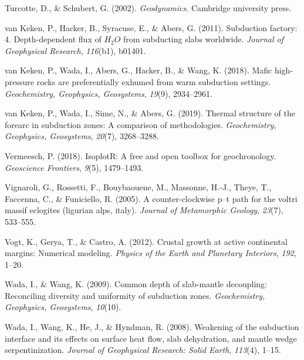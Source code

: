 \begin{CSLReferences}{1}{1}
\leavevmode{}%
Turcotte, D., \& Schubert, G. (2002). \emph{Geodynamics}. Cambridge university press.

\leavevmode{}%
van Keken, P., Hacker, B., Syracuse, E., \& Abers, G. (2011). Subduction factory: 4. Depth-dependent flux of \(H_2O\) from subducting slabs worldwide. \emph{Journal of Geophysical Research}, \emph{116}(b1), b01401.

\leavevmode{}%
van Keken, P., Wada, I., Abers, G., Hacker, B., \& Wang, K. (2018). Mafic high-pressure rocks are preferentially exhumed from warm subduction settings. \emph{Geochemistry, Geophysics, Geosystems}, \emph{19}(9), 2934--2961.

\leavevmode{}%
van Keken, P., Wada, I., Sime, N., \& Abers, G. (2019). Thermal structure of the forearc in subduction zones: A comparison of methodologies. \emph{Geochemistry, Geophysics, Geosystems}, \emph{20}(7), 3268--3288.

\leavevmode{}%
Vermeesch, P. (2018). IsoplotR: A free and open toolbox for geochronology. \emph{Geoscience Frontiers}, \emph{9}(5), 1479--1493.

\leavevmode{}%
Vignaroli, G., Rossetti, F., Bouybaouene, M., Massonne, H.-J., Theye, T., Faccenna, C., \& Funiciello, R. (2005). A counter-clockwise p--t path for the voltri massif eclogites (ligurian alps, italy). \emph{Journal of Metamorphic Geology}, \emph{23}(7), 533--555.

\leavevmode{}%
Vogt, K., Gerya, T., \& Castro, A. (2012). Crustal growth at active continental margins: Numerical modeling. \emph{Physics of the Earth and Planetary Interiors}, \emph{192}, 1--20.

\leavevmode{}%
Wada, I., \& Wang, K. (2009). Common depth of slab-mantle decoupling: Reconciling diversity and uniformity of subduction zones. \emph{Geochemistry, Geophysics, Geosystems}, \emph{10}(10).

\leavevmode{}%
Wada, I., Wang, K., He, J., \& Hyndman, R. (2008). Weakening of the subduction interface and its effects on surface heat flow, slab dehydration, and mantle wedge serpentinization. \emph{Journal of Geophysical Research: Solid Earth}, \emph{113}(4), 1--15.


\end{CSLReferences}

